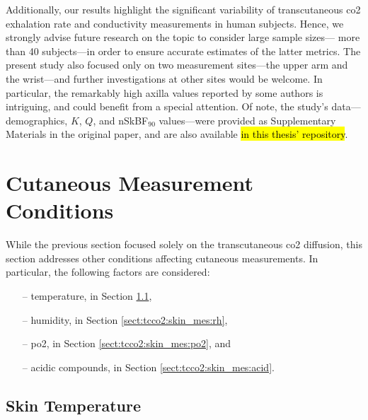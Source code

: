 Additionally, our results highlight the significant variability of transcutaneous \gls{co2} exhalation rate and conductivity measurements in human subjects. Hence, we strongly advise future research on the topic to consider large sample sizes---\ie{} more than 40 subjects---in order to ensure accurate estimates of the latter metrics. The present study also focused only on two measurement sites---the upper arm and the wrist---and further investigations at other sites would be welcome. In particular, the remarkably high axilla values reported by some authors is intriguing, and could benefit from a special attention. Of note, the study's data---demographics, $K$, $Q$, and nSkBF$_{90}$ values---were provided as Supplementary Materials in the original paper\cite{dervieux2023rate}, and are also available \hl{in this thesis' repository}.

\section{Cutaneous Measurement Conditions}\label{sect:tcco2:skin_conditions}

While the previous section focused solely on the transcutaneous \gls{co2} diffusion, this section addresses other conditions affecting cutaneous measurements. In particular, the following factors are considered:
\begin{multicols}{2}
	\begin{itemize}
		\item[--] temperature, in Section \ref{sect:tcco2:skin_mes:temp},
		\item[--] humidity, in Section \ref{sect:tcco2:skin_mes:rh},
		\item[--] \gls{po2}, in Section \ref{sect:tcco2:skin_mes:po2}, and
		\item[--] acidic compounds, in Section \ref{sect:tcco2:skin_mes:acid}.
	\end{itemize}
\end{multicols}

\subsection{Skin Temperature}\label{sect:tcco2:skin_mes:temp}

